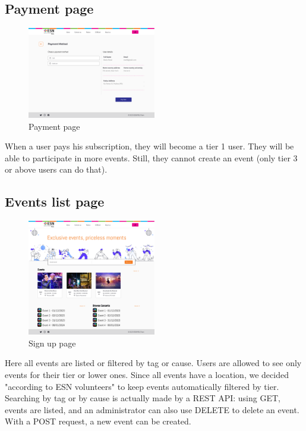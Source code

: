 \subsection{Payment page}
\begin{figure}[H]
    \centering
    \includegraphics[width=0.5\textwidth]{images/PaymentMethod.png}
    \caption{Payment page}
    \label{fig:payment}
\end{figure}
When a user pays his subscription, they will become a tier 1 user. They will be able to participate in more
events. Still, they cannot create an event (only tier 3 or above users can do that).
\subsection{Events list page}
\begin{figure}[H]
    \centering
    \includegraphics[width=0.5\textwidth]{images/EventList.png}
    \caption{Sign up page}
    \label{fig:events}
\end{figure}
Here all events are listed or filtered by tag or cause. Users are allowed to see only events for their tier
or lower ones. Since all events have a location, we decided "according to ESN volunteers" to keep
events automatically filtered by tier.\\
Searching by tag or by cause is actually made by a REST API: using GET, events are listed, and an administrator
can also use DELETE to delete an event. With a POST request, a new event can be created.\\
